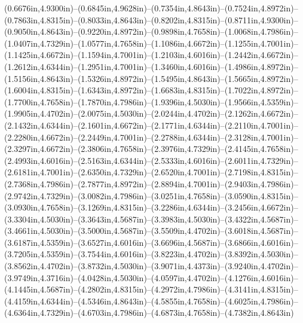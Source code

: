 (0.6676in,4.9300in)--(0.6845in,4.9628in)--(0.7354in,4.8643in)--(0.7524in,4.8972in)--(0.7863in,4.8315in)--(0.8033in,4.8643in)--(0.8202in,4.8315in)--(0.8711in,4.9300in)--(0.9050in,4.8643in)--(0.9220in,4.8972in)--(0.9898in,4.7658in)--(1.0068in,4.7986in)--(1.0407in,4.7329in)--(1.0577in,4.7658in)--(1.1086in,4.6672in)--(1.1255in,4.7001in)--(1.1425in,4.6672in)--(1.1594in,4.7001in)--(1.2103in,4.6016in)--(1.2442in,4.6672in)--(1.2612in,4.6344in)--(1.2951in,4.7001in)--(1.3460in,4.6016in)--(1.4986in,4.8972in)--(1.5156in,4.8643in)--(1.5326in,4.8972in)--(1.5495in,4.8643in)--(1.5665in,4.8972in)--(1.6004in,4.8315in)--(1.6343in,4.8972in)--(1.6683in,4.8315in)--(1.7022in,4.8972in)--(1.7700in,4.7658in)--(1.7870in,4.7986in)--(1.9396in,4.5030in)--(1.9566in,4.5359in)--(1.9905in,4.4702in)--(2.0075in,4.5030in)--(2.0244in,4.4702in)--(2.1262in,4.6672in)--(2.1432in,4.6344in)--(2.1601in,4.6672in)--(2.1771in,4.6344in)--(2.2110in,4.7001in)--(2.2280in,4.6672in)--(2.2449in,4.7001in)--(2.2788in,4.6344in)--(2.3128in,4.7001in)--(2.3297in,4.6672in)--(2.3806in,4.7658in)--(2.3976in,4.7329in)--(2.4145in,4.7658in)--(2.4993in,4.6016in)--(2.5163in,4.6344in)--(2.5333in,4.6016in)--(2.6011in,4.7329in)--(2.6181in,4.7001in)--(2.6350in,4.7329in)--(2.6520in,4.7001in)--(2.7198in,4.8315in)--(2.7368in,4.7986in)--(2.7877in,4.8972in)--(2.8894in,4.7001in)--(2.9403in,4.7986in)--(2.9742in,4.7329in)--(3.0082in,4.7986in)--(3.0251in,4.7658in)--(3.0590in,4.8315in)--(3.0930in,4.7658in)--(3.1269in,4.8315in)--(3.2286in,4.6344in)--(3.2456in,4.6672in)--(3.3304in,4.5030in)--(3.3643in,4.5687in)--(3.3983in,4.5030in)--(3.4322in,4.5687in)--(3.4661in,4.5030in)--(3.5000in,4.5687in)--(3.5509in,4.4702in)--(3.6018in,4.5687in)--(3.6187in,4.5359in)--(3.6527in,4.6016in)--(3.6696in,4.5687in)--(3.6866in,4.6016in)--(3.7205in,4.5359in)--(3.7544in,4.6016in)--(3.8223in,4.4702in)--(3.8392in,4.5030in)--(3.8562in,4.4702in)--(3.8732in,4.5030in)--(3.9071in,4.4373in)--(3.9240in,4.4702in)--(3.9749in,4.3716in)--(4.0428in,4.5030in)--(4.0597in,4.4702in)--(4.1276in,4.6016in)--(4.1445in,4.5687in)--(4.2802in,4.8315in)--(4.2972in,4.7986in)--(4.3141in,4.8315in)--(4.4159in,4.6344in)--(4.5346in,4.8643in)--(4.5855in,4.7658in)--(4.6025in,4.7986in)--(4.6364in,4.7329in)--(4.6703in,4.7986in)--(4.6873in,4.7658in)--(4.7382in,4.8643in) 